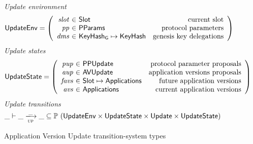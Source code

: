 \begin{figure}[htb]
  \emph{Update environment}
  \begin{equation*}
    \UpdateEnv =
    \left(
      \begin{array}{r@{~\in~}lr}
        \var{slot} & \Slot & \text{current slot}\\
        \var{pp} & \PParams & \text{protocol parameters}\\
        \var{dms} & \KeyHashGen\mapsto\KeyHash & \text{genesis key delegations} \\
      \end{array}
    \right)
  \end{equation*}
  \emph{Update states}
  \begin{equation*}
    \UpdateState =
    \left(
      \begin{array}{r@{~\in~}lr}
        \var{pup} & \PPUpdate & \text{protocol parameter proposals} \\
        \var{aup} & \AVUpdate & \text{application versions proposals} \\
        \var{favs} & \Slot\mapsto\Applications & \text{future application versions} \\
        \var{avs} & \Applications & \text{current application versions} \\
      \end{array}
    \right)
  \end{equation*}
  \emph{Update transitions}
  \begin{equation*}
    \_ \vdash
    \var{\_} \trans{up}{\_} \var{\_}
    \subseteq \powerset (\UpdateEnv \times \UpdateState \times \Update \times \UpdateState)
  \end{equation*}
  \caption{Application Version Update transition-system types}
  \label{fig:ts-types:update}
\end{figure}

